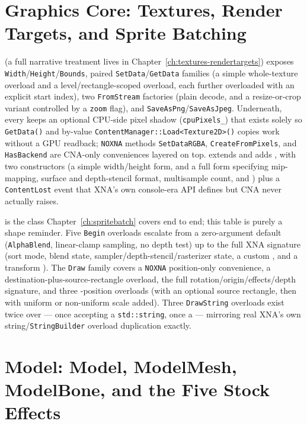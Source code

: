 \section{Graphics Core: Textures, Render Targets, and Sprite Batching}
\label{sec:api-graphics-core}

 (a full narrative treatment lives in
Chapter~\ref{ch:textures-rendertargets}) exposes \texttt{Width}/\texttt{Height}/\texttt{Bounds},
paired \texttt{SetData}/\texttt{GetData} families (a simple whole-texture overload and a
level/rectangle-scoped overload, each further overloaded with an explicit start index), two
\texttt{FromStream} factories (plain decode, and a resize-or-crop variant controlled by a
\texttt{zoom} flag), and \texttt{SaveAsPng}/\texttt{SaveAsJpeg}. Underneath, every
 keeps an optional CPU-side pixel shadow (\texttt{cpuPixels\_}) that exists
solely so \texttt{GetData()} and by-value \texttt{ContentManager::Load<Texture2D>()} copies work
without a GPU readback; \texttt{NOXNA} methods \texttt{SetDataRGBA}, \texttt{CreateFromPixels},
and \texttt{HasBackend} are CNA-only conveniences layered on top. 
extends  and adds , with two constructors (a
simple width/height form, and a full form specifying mip-mapping, surface and depth-stencil
format, multisample count, and ) plus a \texttt{ContentLost} event
that XNA's own console-era API defines but CNA never actually raises.

 is the class Chapter~\ref{ch:spritebatch} covers end to end; this table
is purely a shape reminder. Five \texttt{Begin} overloads escalate from a zero-argument default
(\texttt{AlphaBlend}, linear-clamp sampling, no depth test) up to the full XNA signature
(sort mode, blend state, sampler/depth-stencil/rasterizer state, a custom , and
a transform ). The \texttt{Draw} family covers a \texttt{NOXNA}
position-only convenience, a destination-plus-source-rectangle overload, the full
rotation/origin/effects/depth signature, and three -position overloads
(with an optional source rectangle, then with uniform or non-uniform scale added). Three
\texttt{DrawString} overloads exist twice over --- once accepting a \texttt{std::string}, once
a  --- mirroring real XNA's own string/\texttt{StringBuilder}
overload duplication exactly.

\section{Model: Model, ModelMesh, ModelBone, and the Five Stock Effects}
\label{sec:api-model-effects}

